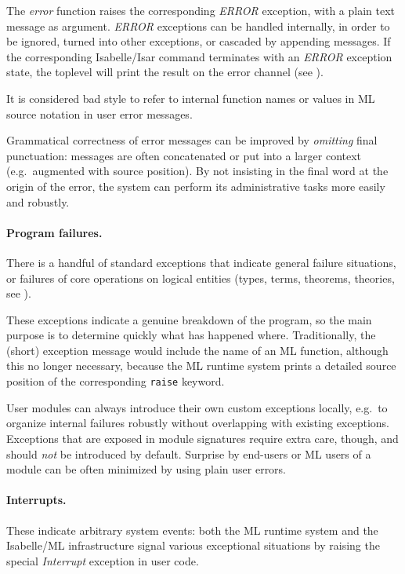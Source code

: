 \begin{isabellebody}
\begin{isamarkuptext}
  The \emph{error} function raises the corresponding \emph{ERROR}
  exception, with a plain text message as argument.  \emph{ERROR}
  exceptions can be handled internally, in order to be ignored, turned
  into other exceptions, or cascaded by appending messages.  If the
  corresponding Isabelle/Isar command terminates with an \emph{ERROR}
  exception state, the toplevel will print the result on the error
  channel (see ).

  It is considered bad style to refer to internal function names or
  values in ML source notation in user error messages.

  Grammatical correctness of error messages can be improved by
  \emph{omitting} final punctuation: messages are often concatenated
  or put into a larger context (e.g.\ augmented with source position).
  By not insisting in the final word at the origin of the error, the
  system can perform its administrative tasks more easily and
  robustly.

  \paragraph{Program failures.}  There is a handful of standard
  exceptions that indicate general failure situations, or failures of
  core operations on logical entities (types, terms, theorems,
  theories, see ).

  These exceptions indicate a genuine breakdown of the program, so the
  main purpose is to determine quickly what has happened where.
  Traditionally, the (short) exception message would include the name
  of an ML function, although this no longer necessary, because the ML
  runtime system prints a detailed source position of the
  corresponding \verb|raise| keyword.

  \medskip User modules can always introduce their own custom
  exceptions locally, e.g.\ to organize internal failures robustly
  without overlapping with existing exceptions.  Exceptions that are
  exposed in module signatures require extra care, though, and should
  \emph{not} be introduced by default.  Surprise by end-users or ML
  users of a module can be often minimized by using plain user errors.

  \paragraph{Interrupts.}  These indicate arbitrary system events:
  both the ML runtime system and the Isabelle/ML infrastructure signal
  various exceptional situations by raising the special
  \emph{Interrupt} exception in user code.


\end{isamarkuptext}
\end{isabellebody}
